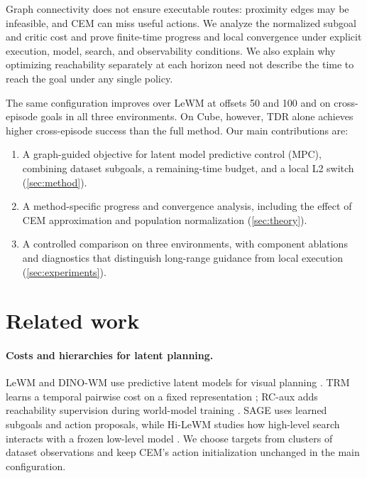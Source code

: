 \documentclass{article}
\theoremstyle{definition}
\theoremstyle{remark}
\begin{document}
Graph connectivity does not ensure executable routes: proximity edges may be infeasible,
and CEM can miss useful actions. We analyze the normalized subgoal and critic cost and prove
finite-time progress and local convergence under explicit execution, model, search,
and observability conditions. We also explain why optimizing reachability separately
at each horizon need not describe the time to reach the goal under any single policy.

The same configuration improves over LeWM at offsets 50 and 100 and on cross-episode
goals in all three environments. On Cube, however, TDR alone achieves higher cross-episode
success than the full method.
Our main contributions are:
\begin{enumerate}[nosep,leftmargin=*]
 \item A graph-guided objective for latent model predictive control (MPC), combining dataset
       subgoals, a remaining-time budget, and a local L2 switch (\cref{sec:method}).
 \item A method-specific progress and convergence analysis, including the effect of CEM
       approximation and population normalization (\cref{sec:theory}).
 \item A controlled comparison on three environments, with component ablations and diagnostics
       that distinguish long-range guidance from local execution (\cref{sec:experiments}).
\end{enumerate}

\section{Related work}
\label{sec:related}
\paragraph{Costs and hierarchies for latent planning.}
LeWM and DINO-WM use predictive latent models for visual planning \citep{lewm,dinowm}.
TRM learns a temporal pairwise cost on a fixed representation \citep{trm};
RC-aux adds reachability supervision during world-model training \citep{rcaux}.
SAGE uses learned subgoals and action proposals, while Hi-LeWM studies how high-level
search interacts with a frozen low-level model \citep{sage,hilewm}.
We choose targets from clusters of dataset observations and keep CEM's action
initialization unchanged in the main configuration.
\end{document}
